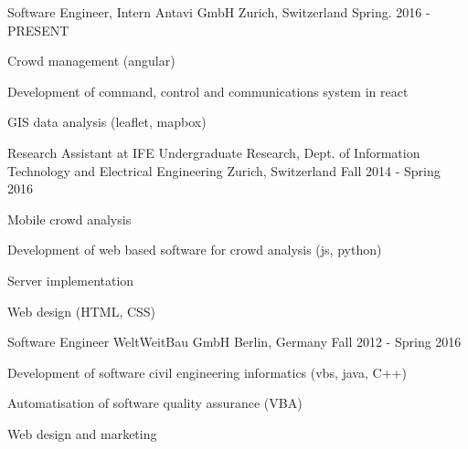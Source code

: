 

\begin{cventries}

  \cventry
    {Software Engineer, Intern} %
    {Antavi GmbH} %
    {Zurich, Switzerland} %
    {Spring. 2016 - PRESENT} %
    {
      \begin{cvitems} %
        \item {Crowd management (angular)}
        \item {Development of command, control and communications system in react }
        \item {GIS data analysis (leaflet, mapbox)}
      \end{cvitems}
    }

  \cventry
    {Research Assistant at IFE} %
    {Undergraduate Research, Dept. of Information Technology and Electrical Engineering} %
    {Zurich, Switzerland} %
    {Fall 2014 - Spring 2016} %
    {
      \begin{cvitems} %
        \item {Mobile crowd analysis }
        \item {Development of web based software for crowd analysis (js, python)}
        \item {Server implementation}
        \item {Web design (HTML, CSS)}
      \end{cvitems}
    }

  \cventry
    {Software Engineer} %
    {WeltWeitBau GmbH} %
    {Berlin, Germany} %
    {Fall 2012 - Spring 2016} %
    {
      \begin{cvitems} %
        \item {Development of software civil engineering informatics (vbs, java, C++)}
        \item {Automatisation of software quality assurance (VBA)}
        \item {Web design and marketing}
      \end{cvitems}
    }


\end{cventries}

